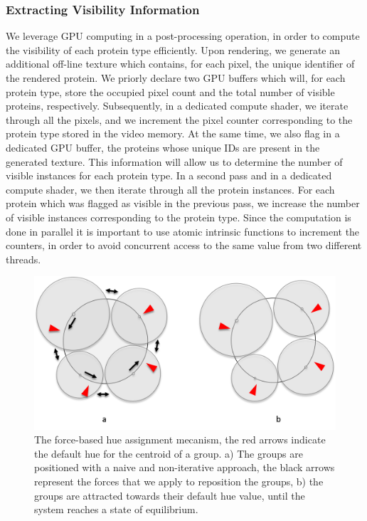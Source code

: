 \documentclass[review,journal]{vgtc}         %
\begin{document}
	\subsubsection{Extracting Visibility Information}
	\label{sssec:extracting}
	We leverage GPU computing in a post-processing operation, in order to compute the visibility of each protein type efficiently.
	Upon rendering, we generate an additional off-line texture which contains, for each pixel, the unique identifier of the rendered protein.
	We priorly declare two GPU buffers which will, for each protein type, store the occupied pixel count and the total number of visible proteins, respectively.
	Subsequently, in a dedicated compute shader, we iterate through all the pixels, and we increment the pixel counter corresponding to the protein type stored in the video memory.
	At the same time, we also flag in a dedicated GPU buffer, the proteins whose unique IDs are present in the generated texture.
	This information will allow us to determine the number of visible instances for each protein type.
	In a second pass and in a dedicated compute shader, we then iterate through all the protein instances.
	For each protein which was flagged as visible in the previous pass, we increase the number of visible instances corresponding to the protein type.
	Since the computation is done in parallel it is important to use atomic intrinsic functions to increment the counters, in order to avoid concurrent access to the same value from two different threads.
	
	\begin{figure}
		\centering
		\includegraphics[width=0.9\linewidth]{"Figures/force-based layout"}
		\caption{The force-based hue assignment mecanism, the red arrows indicate the default hue for the centroid of a group. a) The groups are positioned with a naive and non-iterative approach, the black arrows represent the forces that we apply to reposition the groups, b) the groups are attracted towards their default hue value, until the system reaches a state of equilibrium.}
		\label{fig:force-basedlayout}
	\end{figure}
	
\end{document}
